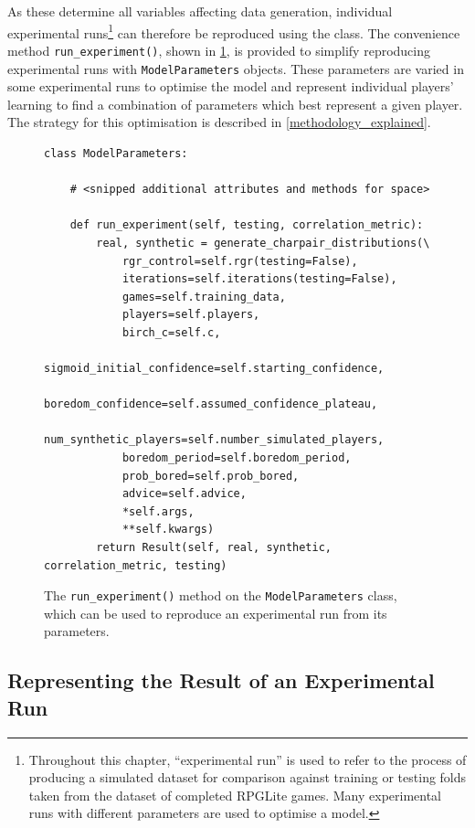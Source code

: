 As these determine all variables affecting data generation, individual
experimental runs\footnote{Throughout this chapter, ``experimental run'' is used
to refer to the process of producing a simulated dataset for comparison against
training or testing folds taken from the dataset of completed RPGLite games.
Many experimental runs with different parameters are used to optimise a model.}
can therefore be reproduced using the class. The convenience method
\lstinline{run_experiment()}, shown in
\cref{fig:ModelParameters_run_experiment_method}, is provided to simplify
reproducing experimental runs with \lstinline{ModelParameters} objects. These
parameters are varied in some experimental runs to optimise the model and
represent individual players' learning to find a combination of parameters which
best represent a given player. The strategy for this optimisation is described
in \cref{methodology_explained}.

\begin{figure}[bp]
  \begin{center}
    \begin{lstlisting}[style=footnotesize_python]
class ModelParameters:

    # <snipped additional attributes and methods for space>

    def run_experiment(self, testing, correlation_metric):
        real, synthetic = generate_charpair_distributions(\
            rgr_control=self.rgr(testing=False),
            iterations=self.iterations(testing=False),
            games=self.training_data,
            players=self.players,
            birch_c=self.c,
            sigmoid_initial_confidence=self.starting_confidence,
            boredom_confidence=self.assumed_confidence_plateau,
            num_synthetic_players=self.number_simulated_players,
            boredom_period=self.boredom_period,
            prob_bored=self.prob_bored,
            advice=self.advice,
            *self.args,
            **self.kwargs)
        return Result(self, real, synthetic, correlation_metric, testing)
    \end{lstlisting}
  \end{center}
  \caption{The \lstinline{run_experiment()} method on the
  \lstinline{ModelParameters} class, which can be used to reproduce an
  experimental run from its parameters.}
  \label{fig:ModelParameters_run_experiment_method}
\end{figure}


\subsection{Representing the Result of an Experimental Run}
\label{representing_results_of_an_experimental_run}

